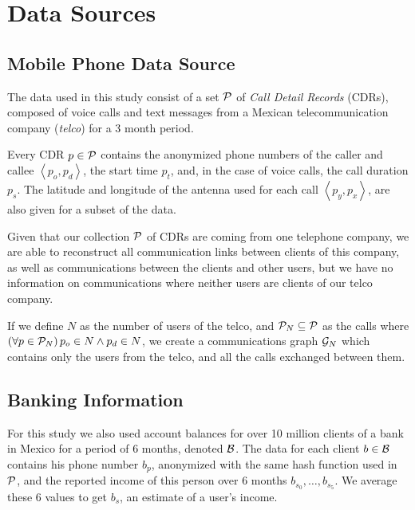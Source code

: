 \section{Data Sources} \label{data_sources}

\subsection{Mobile Phone Data Source}

The data used in this study consist of a set \( \mathcal{P} \) of \textit{Call Detail Records} (CDRs), composed of voice calls and text messages from a Mexican telecommunication company (\textit{telco}) for a 3 month period.

Every CDR \( p \in \mathcal{P} \)  contains the anonymized phone numbers of the caller and callee \( \left< p_o, p_d \right> \), the start time \( p_t \), and, in the case of voice calls, the call duration \( p_s \). The latitude and longitude of the antenna used for each call \( \left< p_y, p_x \right> \), are also given for a subset of the data.

Given that our collection \( \mathcal{P} \) of CDRs are coming from one telephone company, we are able to reconstruct all communication links between clients of this company, as well as communications between the clients and other users, but we have no information on communications where neither users are clients of our telco company.

If we define \( N \) as the number of users of the telco, and \( \mathcal{P}_N \subseteq \mathcal{P} \) as the calls where \( \left( \forall p \in \mathcal{P}_N \right) p_o \in N \wedge p_d \in N \), we create a communications graph \( \mathcal{G}_N \) which contains only the users from the telco, and all the calls exchanged between them.


\subsection{Banking Information}

For this study we also used account balances for over 10 million clients of a bank in Mexico for a period of 6 months, denoted \( \mathcal{B} \). The data for each client \( b \in \mathcal{B} \) contains his phone number \( b_p \), anonymized with the same hash function used in \( \mathcal{P} \), and the reported income of this person over 6 months \( b_{s_0}, \ldots, b_{s_5} \). We average these 6 values to get \( b_s \), an estimate of a user's income.

